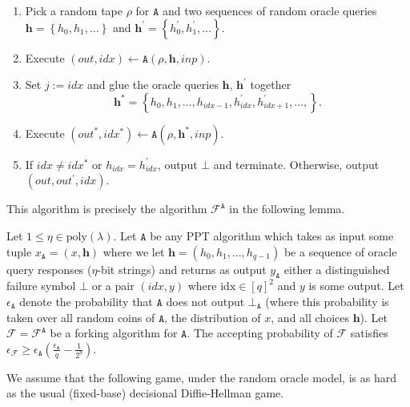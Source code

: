 \documentclass{llncs}
\begin{document}
\begin{enumerate}[(1)]
\item  Pick a random tape $\rho$ for $\texttt{A}$ and two sequences of random oracle queries $\textbf{h} = \left\{h_0, h_1, \ldots\right\}$ and $\textbf{h}^\prime = \left\{h_0^\prime, h_1^\prime, \ldots\right\}$.

\item Execute $(out, idx) \leftarrow \texttt{A}(\rho, \textbf{h}, inp)$.

\item Set $j := idx$ and glue the oracle queries $\textbf{h}$, $\textbf{h}^\prime$ together \[\textbf{h}^* = \left\{h_0, h_1, \ldots, h_{idx - 1}, h_{idx}^\prime, h_{idx+1}^\prime, \ldots, \right\}.\]

\item Execute $(out^*, idx^*) \leftarrow \texttt{A}(\rho, \textbf{h}^*, inp)$.

\item If $idx \neq idx^*$ or $h_{idx} = h_{idx}^\prime$, output $\bot$ and terminate. Otherwise, output $(out, out^\prime, idx)$.
\end{enumerate}

This algorithm is precisely the algorithm $\mathcal{F}^{\texttt{A}}$ in the following lemma.

\begin{lemma}\label{lem:fork}
Let $1 \leq \eta \in \text{poly}(\lambda)$. Let $\texttt{A}$ be any PPT algorithm which takes as input some tuple $x_\texttt{A} = (x, \textbf{h})$ where we let $\textbf{h} = (h_0, h_1, \ldots, h_{q-1})$ be a sequence of oracle query responses ($\eta$-bit strings) and returns as output $y_{\texttt{A}}$ either a distinguished failure symbol $\bot$ or a pair $(\textit{idx}, y)$ where $\text{idx} \in [q]^2$ and $y$ is some output. Let $\epsilon_{\texttt{A}}$ denote the probability that $\texttt{A}$ does not output $\bot_{\texttt{A}}$ (where this probability is taken over all random coins of $\texttt{A}$, the distribution of $x$, and all choices $\textbf{h}$). Let $\mathcal{F} = \mathcal{F}^{\texttt{A}}$ be a forking algorithm for $\texttt{A}$. The accepting probability of $\mathcal{F}$ satisfies $\epsilon_{\mathcal{F}} \geq \epsilon_{\texttt{A}} \left(\frac{\epsilon_{\texttt{A}}}{q} - \frac{1}{2^\eta}\right)$.
\end{lemma}

We assume that the following game, under the random oracle model, is as hard as the usual (fixed-base) decisional Diffie-Hellman game.
\end{document}

